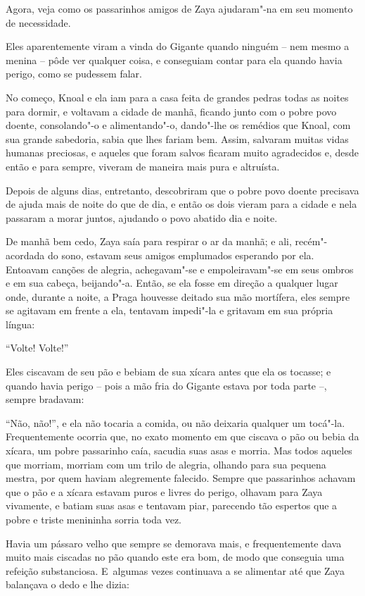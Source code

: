 Agora, veja como os passarinhos amigos de Zaya ajudaram"-na em seu momento de
necessidade.

Eles aparentemente viram a vinda do Gigante quando ninguém -- nem mesmo a
menina -- pôde ver qualquer coisa, e conseguiam contar para ela quando
havia perigo, como se pudessem falar.

No começo, Knoal e ela iam para a casa feita de grandes pedras todas as
noites para dormir, e voltavam a cidade de manhã, ficando junto com o pobre
povo doente, consolando"-o e alimentando"-o, dando"-lhe os remédios que
Knoal, com sua grande sabedoria, sabia que lhes fariam bem. Assim,
salvaram muitas vidas humanas preciosas, e aqueles que foram salvos
ficaram muito agradecidos e, desde então e para sempre, viveram de
maneira mais pura e altruísta.

Depois de alguns dias, entretanto, descobriram que o pobre povo
doente precisava de ajuda mais de noite do que de dia, e então os dois
vieram para a cidade e nela passaram a morar juntos, ajudando o povo
abatido dia e noite.

De manhã bem cedo, Zaya saía para respirar o ar da manhã; e ali,
recém"-acordada do sono, estavam seus amigos emplumados esperando por
ela. Entoavam canções de alegria, achegavam"-se e empoleiravam"-se em seus
ombros e em sua cabeça, beijando"-a. Então, se ela fosse em direção a
qualquer lugar onde, durante a noite, a Praga houvesse deitado sua mão
mortífera, eles sempre se agitavam em frente a ela, tentavam impedi"-la e
gritavam em sua própria língua:

``Volte! Volte!''

Eles ciscavam de seu pão e bebiam de sua xícara antes que ela os
tocasse; e quando havia perigo -- pois a mão fria do Gigante estava por
toda parte --, sempre bradavam:

``Não, não!'', e ela não tocaria a comida, ou não deixaria qualquer um
tocá"-la. Frequentemente ocorria que, no exato momento em que ciscava o
pão ou bebia da xícara, um pobre passarinho caía, sacudia suas asas e
morria. Mas todos aqueles que morriam, morriam com um trilo de alegria,
olhando para sua pequena mestra, por quem haviam alegremente
falecido. Sempre que passarinhos achavam que o pão e a xícara estavam
puros e livres do perigo, olhavam para Zaya vivamente, e batiam suas
asas e tentavam piar, parecendo tão espertos que a pobre e triste
menininha sorria toda vez.

Havia um pássaro velho que sempre se demorava mais, e frequentemente
dava muito mais ciscadas no pão quando este era bom, de modo que
conseguia uma refeição substanciosa. E~algumas vezes continuava a se
alimentar até que Zaya balançava o dedo e lhe dizia:

